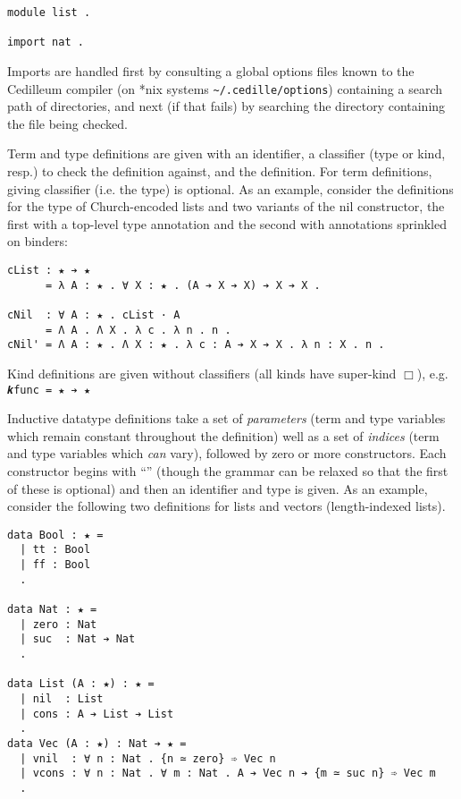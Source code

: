 \documentclass{article}
\begin{document}
\begin{verbatim}
module list .

import nat .
\end{verbatim}

\noindent Imports are handled first by consulting a global options files
known to the Cedilleum compiler (on *nix systems \verb|~/.cedille/options|)
containing a search path of directories, and next (if that fails) by searching
the directory containing the file being checked.

Term and type definitions are given with an identifier, a classifier (type or
kind, resp.) to check the definition against, and the definition. For term
definitions, giving classifier (i.e. the type) is optional. As an example,
consider the definitions for the type of Church-encoded lists and two variants
of the nil constructor, the first with a top-level type annotation and the
second with annotations sprinkled on binders:

\begin{verbatim}
cList : ★ ➔ ★
      = λ A : ★ . ∀ X : ★ . (A ➔ X ➔ X) ➔ X ➔ X .

cNil  : ∀ A : ★ . cList · A
      = Λ A . Λ X . λ c . λ n . n .
cNil' = Λ A : ★ . Λ X : ★ . λ c : A ➔ X ➔ X . λ n : X . n .
\end{verbatim}

Kind definitions are given without classifiers (all kinds have super-kind
$\Box$), e.g. \verb;𝒌func = ★ ➔ ★;

Inductive datatype definitions take a set of \textit{parameters} (term and type
variables which remain constant throughout the definition) well as a set of
\textit{indices} (term and type variables which \textit{can} vary), followed by
zero or more constructors. Each constructor begins with ``\textbf{\textbar}''
(though the grammar can be relaxed so that the first of these is optional) and
then an identifier and type is given. As an example, consider the following two
definitions for lists and vectors (length-indexed lists).

\begin{verbatim}
data Bool : ★ =
  | tt : Bool
  | ff : Bool
  .

data Nat : ★ =
  | zero : Nat
  | suc  : Nat ➔ Nat
  .

data List (A : ★) : ★ =
  | nil  : List
  | cons : A ➔ List ➔ List
  .
data Vec (A : ★) : Nat ➔ ★ =
  | vnil  : ∀ n : Nat . {n ≃ zero} ➾ Vec n
  | vcons : ∀ n : Nat . ∀ m : Nat . A ➔ Vec n ➔ {m ≃ suc n} ➾ Vec m
  .
\end{verbatim}
\end{document}
